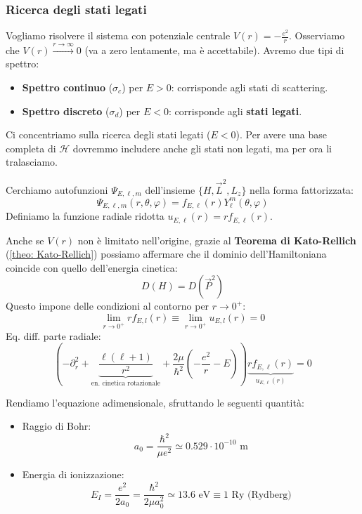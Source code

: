 \subsubsection{Ricerca degli stati legati}
Vogliamo risolvere il sistema con potenziale centrale \( V(r) = -\frac{e^2}{r} \).
Osserviamo che \( V(r) \xrightarrow{r \to \infty} 0 \) (va a zero lentamente, ma è accettabile).
Avremo due tipi di spettro:
\begin{itemize}
    \item \textbf{Spettro continuo} (\( \sigma_c \)) per \( E > 0 \): corrisponde agli stati di scattering.
    \item \textbf{Spettro discreto} (\( \sigma_d \)) per \( E < 0 \): corrisponde agli \textbf{stati legati}.
\end{itemize}
Ci concentriamo sulla ricerca degli stati legati (\( E < 0 \)). Per avere una base completa di \( \mathcal{H} \) dovremmo includere anche gli stati non legati, ma per ora li tralasciamo.

Cerchiamo autofunzioni \( \Psi_{E,\ell,m} \) dell'insieme \( \{ H, \vec{L}^2, L_z \} \) nella forma fattorizzata:
\begin{equation}
    \Psi_{E,\ell,m}(r, \theta, \varphi) = f_{E,\ell}(r) Y_\ell^m(\theta, \varphi)
\end{equation}
Definiamo la funzione radiale ridotta \( u_{E,\ell}(r) = r f_{E,\ell}(r) \).

Anche se \( V(r) \) non è limitato nell'origine, grazie al \textbf{Teorema di Kato-Rellich} (\ref{theo: Kato-Rellich}) possiamo affermare che il dominio dell'Hamiltoniana coincide con quello dell'energia cinetica:
\[
D(H) = D(\vec{P}^2)
\]
Questo impone delle condizioni al contorno per \( r \to 0^+ \):
\begin{equation}
    \lim_{r \to 0^+} r f_{E,l}(r) \equiv \lim_{r \to 0^+} u_{E,l}(r) = 0
\end{equation}
Eq. diff. parte radiale:
\begin{equation}
    \left( -\partial_r^2 + \underbrace{\frac{\ell(\ell+1)}{r^2}}_{\text{en. cinetica rotazionale}} + \frac{2\mu}{\hbar^2} \left( -\frac{e^2}{r} - E \right) \right) \underbrace{r f_{E,\ell}(r)}_{u_{E,\ell}(r)} = 0
\end{equation}

Rendiamo l'equazione adimensionale, sfruttando le seguenti quantità:
\begin{itemize}
    \item Raggio di Bohr:
    \begin{equation}
        a_0 = \frac{\hbar^2}{\mu e^2} \simeq 0.529 \cdot 10^{-10} \text{ m}
    \end{equation}
    \item Energia di ionizzazione:
    \begin{equation}
        E_I = \frac{e^2}{2a_0} = \frac{\hbar^2}{2\mu a_0^2} \simeq 13.6 \text{ eV} \equiv 1 \text{ Ry (Rydberg)}
    \end{equation}
\end{itemize}


